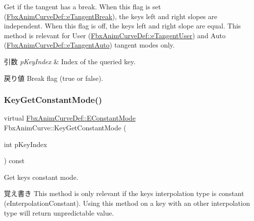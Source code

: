 Get if the tangent has a break. When this flag is set (\hyperlink{class_fbx_anim_curve_def_ac810ccc5ca0527704ab5175479964b87ab4d85a1a0474226be85b885518f6c847}{Fbx\+Anim\+Curve\+Def\+::e\+Tangent\+Break}), the key\textquotesingle{}s left and right slopes are independent. When this flag is off, the key\textquotesingle{}s left and right slope are equal. This method is relevant for User (\hyperlink{class_fbx_anim_curve_def_ac810ccc5ca0527704ab5175479964b87a199cb16b2c861b12c334093ce796cb86}{Fbx\+Anim\+Curve\+Def\+::e\+Tangent\+User}) and Auto (\hyperlink{class_fbx_anim_curve_def_ac810ccc5ca0527704ab5175479964b87a56e3bad364851277281e94e81327dd25}{Fbx\+Anim\+Curve\+Def\+::e\+Tangent\+Auto}) tangent modes only. 
\begin{DoxyParams}{引数}
{\em p\+Key\+Index} & Index of the queried key. \\
\hline
\end{DoxyParams}
\begin{DoxyReturn}{戻り値}
Break flag ({\ttfamily true} or {\ttfamily false}). 
\end{DoxyReturn}
\mbox{\label{class_fbx_anim_curve_a990e2b6b948eec3562abc2c74b6d0ef2}} 
\subsubsection{\texorpdfstring{Key\+Get\+Constant\+Mode()}{KeyGetConstantMode()}}
{\footnotesize\ttfamily virtual \hyperlink{class_fbx_anim_curve_def_a52885abd392ac8ac3da94bafc5fddd64}{Fbx\+Anim\+Curve\+Def\+::\+E\+Constant\+Mode} Fbx\+Anim\+Curve\+::\+Key\+Get\+Constant\+Mode (\begin{DoxyParamCaption}\item[{int}]{p\+Key\+Index }\end{DoxyParamCaption}) const\hspace{0.3cm}{\ttfamily [pure virtual]}}

Get key\textquotesingle{}s constant mode. \begin{DoxyNote}{覚え書き}
This method is only relevant if the key\textquotesingle{}s interpolation type is constant (e\+Interpolation\+Constant). Using this method on a key with an other interpolation type will return unpredictable value. 
\end{DoxyNote}


